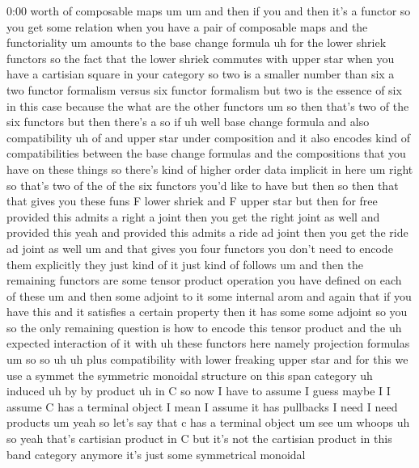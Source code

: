\begin{unfinished}{0:00}
worth  of  composable
maps
um
um  and  then  if  you  and  then  it's  a
functor  so  you  get  some  relation  when
you  have  a  pair  of  composable  maps  and
the
functoriality  um  amounts  to  the  base
change
formula  uh  for  the  lower  shriek  functors
so  the  fact  that  the  lower  shriek
commutes  with  upper  star  when  you  have  a
cartisian  square  in  your  category
so  two  is  a  smaller  number  than  six  a
two  functor  formalism  versus  six  functor
formalism  but  two  is  the  essence  of  six
in  this  case  because  the  what  are  the
other  functors  um  so  then  that's  two  of
the  six  functors  but  then  there's
a  so  if  uh
well  base  change  formula  and  also
compatibility  uh
of  and  upper  star  under
composition  and  it  also  encodes  kind  of
compatibilities  between  the  base  change
formulas  and  the  compositions  that  you
have  on  these  things  so  there's  kind  of
higher  order  data  implicit  in
here  um  right  so  that's  two  of  the  of
the  six  functors  you'd  like  to  have  but
then  so  then  that  that  gives  you  these
funs  F  lower  shriek  and  F  upper  star  but
then  for  free  provided  this  admits  a
right  a  joint  then  you  get  the  right
joint  as  well  and  provided  this  yeah  and
provided  this  admits  a  ride  ad  joint
then  you  get  the  ride  ad  joint  as  well
um  and  that  gives  you  four  functors  you
don't  need  to  encode  them  explicitly
they  just  kind  of  it  just  kind  of
follows  um  and  then  the  remaining
functors  are  some  tensor  product
operation  you  have  defined  on  each  of
these  um  and  then  some  adjoint  to  it
some  internal  arom
and  again  that  if  you  have  this  and  it
satisfies  a  certain  property  then  it  has
some  some  adjoint  so  you  so  the  only
remaining  question  is  how  to  encode  this
tensor  product  and  the  uh  expected
interaction  of  it  with  uh  these  functors
here  namely  projection
formulas  um
so
so
uh
uh  plus
compatibility  with  lower  freaking  upper
star  and  for
this  we  use  a  symmet  the  symmetric
monoidal
structure  on  this  span
category  uh
induced  uh
by  by
product  uh  in  C  so  now  I  have  to  assume
I  guess  maybe  I  I  assume  C  has  a
terminal  object  I  mean  I  assume  it  has
pullbacks  I  need  I  need  products
um  yeah  so  let's  say  that  c  has  a
terminal  object
um
see  um
whoops
uh  so  yeah  that's  cartisian  product  in  C
but  it's  not  the  cartisian  product  in
this  band  category  anymore  it's  just
some  symmetrical  monoidal

\end{unfinished}
